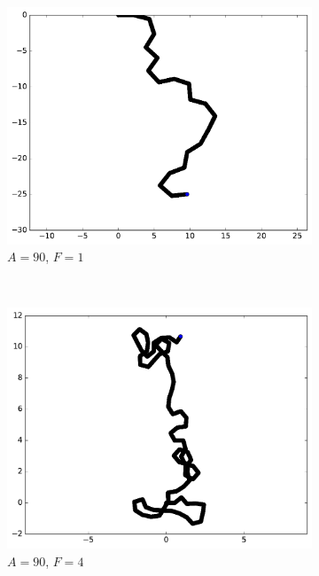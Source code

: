 \begin{figure}[htb]
\begin{subfigure}[t]{\subImgWmo}
			\includegraphics[width=\textwidth]{figures/ch3/synTraj_219_90_1}
			\caption[$A = 90$, $F=1$]{$A = 90$, $F=1$}
			\label{fig:synTraj_219_90_1}
		\end{subfigure}
		~
		\begin{subfigure}[t]{\subImgWmo}
			\centering
			\includegraphics[width=\textwidth]{figures/ch3/synTraj_219_90_4}
			\caption[$A = 90$, $F=4$]{$A = 90$, $F=4$}
			\label{fig:synTraj_219_90_4}
		\end{subfigure}
		~
		\begin{subfigure}[t]{\subImgWmo}
			\centering

\end{subfigure}
\end{figure}
